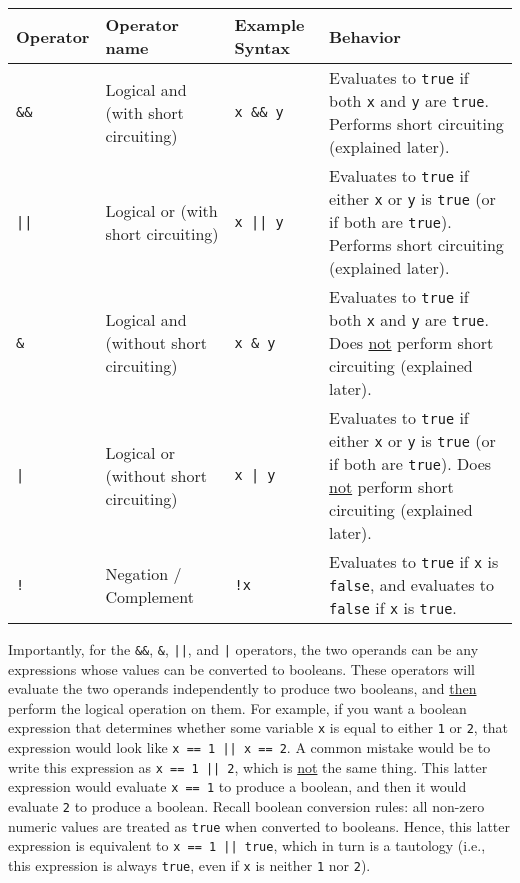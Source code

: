 \documentclass{article}
\begin{document}
\begin{tabular}{|p{}|p{}|p{}|p{}|}
    \hline
    Operator & Operator name & Example Syntax & Behavior \\
    \hline
    \texttt{\&\&} & Logical and (with short circuiting) & \texttt{x \&\& y} & Evaluates to \texttt{true} if both \texttt{x} and \texttt{y} are \texttt{true}. Performs short circuiting (explained later).\\
    \hline
    \texttt{||} & Logical or (with short circuiting) & \texttt{x || y} & Evaluates to \texttt{true} if either \texttt{x} or \texttt{y} is \texttt{true} (or if both are \texttt{true}). Performs short circuiting (explained later).\\
    \hline
    \texttt{\&} & Logical and (without short circuiting) & \texttt{x \& y} & Evaluates to \texttt{true} if both \texttt{x} and \texttt{y} are \texttt{true}. Does \ul{not} perform short circuiting (explained later).\\
    \hline
    \texttt{|} & Logical or (without short circuiting) & \texttt{x | y} & Evaluates to \texttt{true} if either \texttt{x} or \texttt{y} is \texttt{true} (or if both are \texttt{true}). Does \ul{not} perform short circuiting (explained later).\\
    \hline
    \texttt{!} & Negation / Complement & \texttt{!x} & Evaluates to \texttt{true} if \texttt{x} is \texttt{false}, and evaluates to \texttt{false} if \texttt{x} is \texttt{true}.\\
    \hline
\end{tabular}

Importantly, for the \texttt{\&\&}, \texttt{\&}, \texttt{||}, and \texttt{|} operators, the two operands can be any expressions whose values can be converted to booleans. These operators will evaluate the two operands independently to produce two booleans, and \ul{then} perform the logical operation on them. For example, if you want a boolean expression that determines whether some variable \texttt{x} is equal to either \texttt{1} or \texttt{2}, that expression would look like \texttt{x == 1 || x == 2}. A common mistake would be to write this expression as \texttt{x == 1 || 2}, which is \ul{not} the same thing. This latter expression would evaluate \texttt{x == 1} to produce a boolean, and then it would evaluate \texttt{2} to produce a boolean. Recall boolean conversion rules: all non-zero numeric values are treated as \texttt{true} when converted to booleans. Hence, this latter expression is equivalent to \texttt{x == 1 || true}, which in turn is a tautology (i.e., this expression is always \texttt{true}, even if \texttt{x} is neither \texttt{1} nor \texttt{2}).
\end{document}
